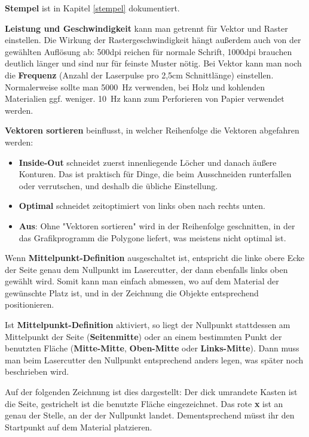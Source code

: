 \documentclass{\basedir/fablab-document}
\begin{document}
\textbf{Stempel} ist in Kapitel \ref{stempel} dokumentiert.

\textbf{Leistung und Geschwindigkeit} kann man getrennt für Vektor und Raster einstellen. Die Wirkung der Rastergeschwindigkeit hängt außerdem auch von der gewählten Auflösung ab: 500dpi reichen für normale Schrift, 1000dpi brauchen deutlich länger und sind nur für feinste Muster nötig. Bei Vektor kann man noch die \textbf{Frequenz} (Anzahl der Laserpulse pro 2,5cm Schnittlänge) einstellen. Normalerweise sollte man 5000~Hz verwenden, bei Holz und kohlenden Materialien ggf. weniger. 10~Hz kann zum Perforieren von Papier verwendet werden. %

\textbf{Vektoren sortieren} beinflusst, in welcher Reihenfolge die Vektoren abgefahren werden:
\begin{itemize}
 \item \textbf{Inside-Out} schneidet zuerst innenliegende Löcher und danach äußere Konturen.  Das ist praktisch für Dinge, die beim Ausschneiden runterfallen oder verrutschen, und deshalb die übliche Einstellung.
 \item \textbf{Optimal} schneidet zeitoptimiert von links oben nach rechts unten.
 \item \textbf{Aus}: Ohne "Vektoren sortieren" wird in der Reihenfolge geschnitten, in der das Grafikprogramm die Polygone liefert, was meistens nicht optimal ist.
\end{itemize}


Wenn \textbf{Mittelpunkt-Definition} ausgeschaltet ist, entspricht die linke obere Ecke der Seite genau dem Nullpunkt im Lasercutter, der dann ebenfalls links oben gewählt wird. Somit kann man einfach abmessen, wo auf dem Material der gewünschte Platz ist, und in der Zeichnung die Objekte entsprechend positionieren.

Ist \textbf{Mittelpunkt-Definition} aktiviert, so liegt der Nullpunkt stattdessen am Mittelpunkt der Seite (\textbf{Seiten\-mitte}) oder an einem bestimmten Punkt der benutzten Fläche (\textbf{Mitte-Mitte}, \textbf{Oben-Mitte} oder \textbf{Links-Mitte}). Dann muss man beim Lasercutter den Nullpunkt entsprechend anders legen, was später noch beschrieben wird.

Auf der folgenden Zeichnung ist dies dargestellt: Der dick umrandete Kasten ist die Seite, gestrichelt ist die benutzte Fläche eingezeichnet. Das rote \textbf{x} ist an genau der Stelle, an der der Nullpunkt landet. Dementsprechend müsst ihr den Startpunkt auf dem Material platzieren.
\end{document}
